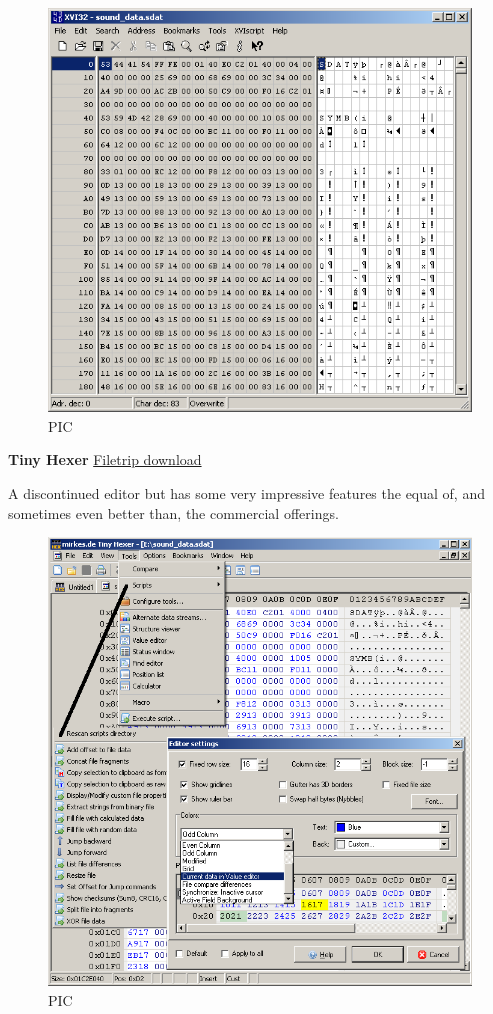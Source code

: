 \documentclass[
]{book}
\begin{document}
\begin{figure}
\centering
\includegraphics{images/4_home_fast6191_romhackingguide_unrenamed_files___rs_romhackingguidehexeditorsshowcaseXVI32_1.png}
\caption{PIC}
\end{figure}

\textbf{Tiny Hexer} \href{http://filetrip.net/pc-downloads/applications/download-tiny-hexer-1816-f29009.html}{Filetrip download}

A discontinued editor but has some very impressive features the equal of, and sometimes even better than, the commercial offerings.

\begin{figure}
\centering
\includegraphics{images/5_home_fast6191_romhackingguide_unrenamed_files___romhackingguidehexeditorsshowcasetinyhexer1.png}
\caption{PIC}
\end{figure}
\end{document}
